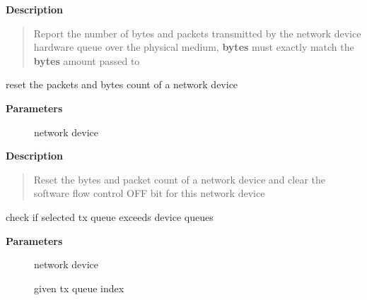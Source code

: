 \documentclass[a4paper,8pt,english]{sphinxmanual}
\begin{document}
\textbf{Description}
\begin{quote}

Report the number of bytes and packets transmitted by the network device
hardware queue over the physical medium, \textbf{bytes} must exactly match the
\textbf{bytes} amount passed to {\hyperref[networking/kapi:c.netdev_sent_queue]{\emph{}}}
\end{quote}

\begin{fulllineitems}
\label{networking/kapi:c.netdev_reset_queue}
reset the packets and bytes count of a network device

\end{fulllineitems}


\textbf{Parameters}
\begin{description}
\item[{}] \leavevmode
network device

\end{description}

\textbf{Description}
\begin{quote}

Reset the bytes and packet count of a network device and clear the
software flow control OFF bit for this network device
\end{quote}

\begin{fulllineitems}
\label{networking/kapi:c.netdev_cap_txqueue}
check if selected tx queue exceeds device queues

\end{fulllineitems}


\textbf{Parameters}
\begin{description}
\item[{}] \leavevmode
network device

\item[{}] \leavevmode
given tx queue index

\end{description}
\end{document}
